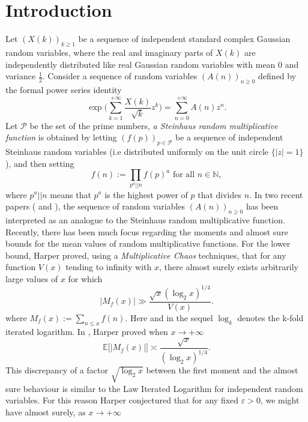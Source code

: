 \documentclass{article}
\begin{document}
\section{Introduction}
Let $(X(k))_{k\geqslant 1}$ be a sequence of independent standard complex Gaussian random variables, where the real and imaginary parts of $X(k)$ are independently distributed like real Gaussian random variables with mean $0$ and variance $\frac{1}{2}$. Consider a sequence of random variables $(A(n))_{n\geqslant 0}$ defined by the formal power series identity 
\begin{equation}\label{link_xk_an}
    \exp\bigg( \sum_{k=1}^{+\infty} \frac{X(k)}{\sqrt{k}}z^k \bigg)= \sum_{n=0}^{+\infty} A(n)z^n.
\end{equation}
Let $\mathcal{P}$ be the set of the prime numbers, \textit{a Steinhaus random multiplicative function} is obtained by letting $(f(p))_{p\in \mathcal{P}}$ be a sequence of independent Steinhaus random variables (i.e distributed uniformly on the unit circle $\{ |z|=1\}$), and then setting
$$ f(n):= \prod_{p^{a}||n} f(p)^{a}  \text{ for all } n\in \mathbb{N},$$
where $ p^{a}||n$ means that $p^{a}$ is the highest power of $p$ that divides $n$. In two recent papers (\cite{model_zaman} and \cite{model_maxim}), the sequence of random variables $(A(n))_{n\geqslant 0}$ has been interpreted as an analogue to the Steinhaus random multiplicative function. \\
Recently, there has been much focus regarding the moments and almost sure bounds for the mean values of random multiplicative functions. For the lower bound, Harper \cite{Harper3} proved, using a \textit{Multiplicative Chaos} techniques, that for any function $V(x)$ tending to infinity with $x$, there almost surely exists arbitrarily large values of $x$ for which
\begin{equation}\label{Harper_lower_b}
    \big|M_f(x) \big| \gg \frac{\sqrt{x} (\log_2 x)^{1/4}}{V(x)}.
\end{equation}
where $M_f(x):=\sum_{n\leqslant x}f(n)$. Here and in the sequel $\log_k$ denotes the k-fold iterated logarithm. In \cite{Harper}, Harper proved when $x \to +\infty$
\begin{equation}\label{Harper_approximation}
    \mathbb{E}\bigg[ \big| M_f(x)\big| \bigg] \asymp \frac{\sqrt{x}}{(\log_2 x)^{1/4}}.
\end{equation}
This discrepancy of a factor $\sqrt{\log_2 x}$ between the first moment and the almost sure behaviour is similar to the Law Iterated Logarithm for independent random variables. For this reason Harper conjectured that for any fixed $\varepsilon >0$, we might have almost surely, as $x \to +\infty$
\end{document}
